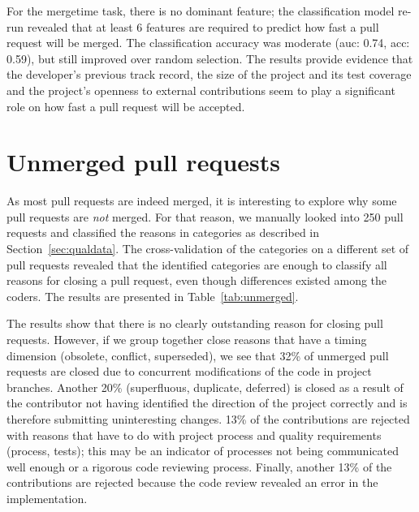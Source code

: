 \documentclass{sig-alternate}
\begin{document}
For the \textsf{mergetime} task, there is no dominant feature; the
classification model re-run revealed that at least 6 features are required to
predict how fast a pull request will be merged. The classification accuracy was
moderate ({\sc auc:} 0.74, {\sc acc}: 0.59), but still improved over random
selection. The results provide evidence that the developer's previous
track record, the size of the project and its test coverage and the project's
openness to external contributions seem to play a significant role on
how fast a pull request will be accepted.


\noindent {}

\section{Unmerged pull requests}

As most pull requests are indeed merged, it is interesting to explore why some
pull requests are \emph{not} merged. For that reason, we manually looked into 250 pull
requests and classified the reasons in categories as described in
Section~\ref{sec:qualdata}. The cross-validation of the categories on a
different set of pull requests revealed that the identified categories are
enough to classify all reasons for closing a pull request, even though
differences existed among the coders.  The results are presented in
Table~\ref{tab:unmerged}. 

The results show that there is no clearly outstanding reason for closing pull
requests. However, if we group together close reasons that have a timing
dimension (\textsf{obsolete}, \textsf{conflict}, \textsf{superseded}), we see
that 32\% of unmerged pull requests are closed due to concurrent modifications
of the code in project branches. Another 20\% (\textsf{superfluous},
\textsf{duplicate}, \textsf{deferred}) is closed as a result of the contributor
not having identified the direction of the project correctly and is therefore
submitting uninteresting changes. 13\% of the contributions are rejected with
reasons that have to do with project process and quality requirements
(\textsf{process}, \textsf{tests}); this may
be an indicator of processes not being communicated well enough or a rigorous
code reviewing process. Finally, another 13\% of the contributions are
rejected because the code review revealed an error in the implementation.
\end{document}
